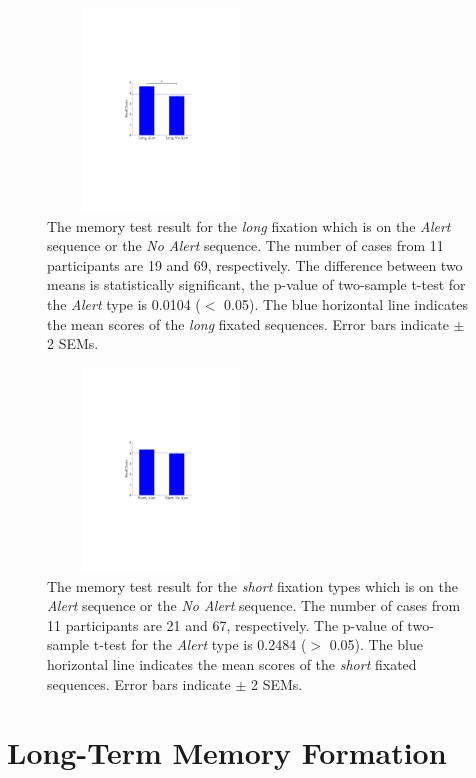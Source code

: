 \documentclass[10pt,letterpaper]{article}
\begin{document}
\begin{figure}
  \centerline{\includegraphics[width=60mm,height=54mm,trim=65mm 103mm 68mm 100mm]{./eps/memtest_long.pdf}}
  \caption{The memory test result for the \textit{long} fixation which is on the \textit{Alert} sequence or the \textit{No Alert} sequence. The number of cases from 11 participants are 19 and 69, respectively. The difference between two means is statistically significant, the p-value of two-sample t-test for the \textit{Alert} type is 0.0104 ($<$ 0.05). The blue horizontal line indicates the mean scores of the \textit{long} fixated sequences. Error bars indicate $\pm$ 2 SEMs.}
  \label{fig:memtest-long}
\end{figure}

\begin{figure}
  \centerline{\includegraphics[width=60mm,height=54mm,trim=65mm 103mm 68mm 100mm]{./eps/memtest_short.pdf}}
  \caption{The memory test result for the \textit{short} fixation types which is on the \textit{Alert} sequence or the \textit{No Alert} sequence. The number of cases from 11 participants are 21 and 67, respectively. The p-value of two-sample t-test for the \textit{Alert} type is 0.2484 ($>$ 0.05). The blue horizontal line indicates the mean scores of the \textit{short} fixated sequences. Error bars indicate $\pm$ 2 SEMs.}
  \label{fig:memtest-short}
\end{figure}


\section{Long-Term Memory Formation}
\end{document}
